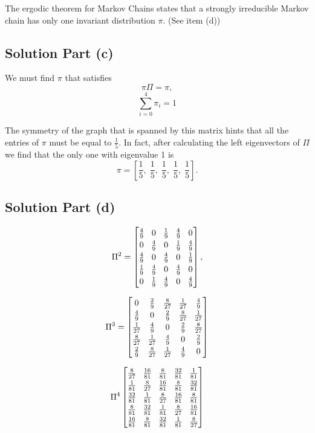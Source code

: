 The ergodic theorem for Markov Chains states that a strongly irreducible Markov chain has only one invariant distribution $\pi$. (See item (d))

\subsection*{Solution Part (c)}

We must find $\pi$ that satisfies 
\[ \pi \Pi = \pi, \]
\[ \sum_{i = 0}^4 \pi_i = 1 \]

The symmetry of the graph that is spanned by this matrix hints that all the entries of $\pi$ must be equal to $\frac{1}{5}$. In fact, after calculating the left eigenvectors of $\Pi$ we find that the only one with eigenvalue 1 is 
\[ \pi = \left[ \frac{1}{5},\; \frac{1}{5},\;\frac{1}{5},\;\frac{1}{5},\;\frac{1}{5} \right]. \]

\subsection*{Solution Part (d)}

\[ \arraycolsep=4pt\def\arraystretch{1.2}
\Pi^2 = \left[\begin{matrix}\frac{4}{9} & 0 & \frac{1}{9} & \frac{4}{9} & 0\\0 & \frac{4}{9} & 0 & \frac{1}{9} & \frac{4}{9}\\\frac{4}{9} & 0 & \frac{4}{9} & 0 & \frac{1}{9}\\\frac{1}{9} & \frac{4}{9} & 0 & \frac{4}{9} & 0\\0 & \frac{1}{9} & \frac{4}{9} & 0 & \frac{4}{9}\end{matrix}\right],\]

\[ \arraycolsep=4pt\def\arraystretch{1.2}
\Pi^3 = \left[\begin{matrix}0 & \frac{2}{9} & \frac{8}{27} & \frac{1}{27} & \frac{4}{9}\\\frac{4}{9} & 0 & \frac{2}{9} & \frac{8}{27} & \frac{1}{27}\\\frac{1}{27} & \frac{4}{9} & 0 & \frac{2}{9} & \frac{8}{27}\\\frac{8}{27} & \frac{1}{27} & \frac{4}{9} & 0 & \frac{2}{9}\\\frac{2}{9} & \frac{8}{27} & \frac{1}{27} & \frac{4}{9} & 0\end{matrix}\right]\]

\[ \arraycolsep=4pt\def\arraystretch{1.2}
\Pi^4\left[\begin{matrix}\frac{8}{27} & \frac{16}{81} & \frac{8}{81} & \frac{32}{81} & \frac{1}{81}\\\frac{1}{81} & \frac{8}{27} & \frac{16}{81} & \frac{8}{81} & \frac{32}{81}\\\frac{32}{81} & \frac{1}{81} & \frac{8}{27} & \frac{16}{81} & \frac{8}{81}\\\frac{8}{81} & \frac{32}{81} & \frac{1}{81} & \frac{8}{27} & \frac{16}{81}\\\frac{16}{81} & \frac{8}{81} & \frac{32}{81} & \frac{1}{81} & \frac{8}{27}\end{matrix}\right]   \]

